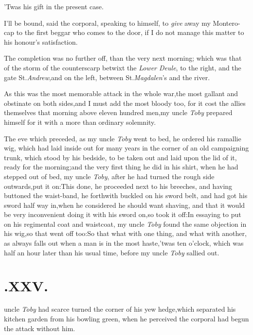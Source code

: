 \documentclass{article}
\begin{document}
\tsh ’Twas his gift in the present case.

I’ll be bound, said the corporal, speaking to himself, to
\textit{give} away my Montero-cap to the first beggar who comes to the door,
if I do not manage this matter to\break
his honour’s satisfaction.

The completion was no further off, than the very next morning; which was that of the
storm of the counterscarp betwixt the \textit{Lower Deule}, to the right, and the
gate St.\@ \textit{Andrew},\tsk and on the left, between St.\@ \textit{Magdalen}’s
and the river.

As this was the most memorable attack in the whole
war,\tsk the most gallant and obstinate on both sides,\tsk and
I must add the most bloody too, for it cost the allies themselves
that morning above eleven hundred men,\tsk my uncle \textit{Toby}
prepared himself for it with a more than ordinary solemnity.

The eve which preceded, as my uncle \textit{Toby} went to bed, he
ordered his ramallie wig, which had laid inside out for many years
in the corner of an old campaigning trunk, which stood by his
\setlength{\baselineskip}{13.3636pt}%
bedside, to be taken out and laid upon the lid of it, ready for the morning;\tsk and the
very first thing he did in his shirt, when he had stepped out of
bed, my uncle \textit{Toby}, after he had turned the rough side
outwards,\tsk put it on:\tsh\break This done, he proceeded
next to his breeches, and having buttoned the waist-band, he
forthwith buckled on his sword belt, and had got his sword half way
in,\break\tsk when he considered he should want shaving, and that it
would be very inconvenient doing it with his sword on,\tsk so
took it off:\tsh In essaying to put on his regimental coat
and waistcoat, my uncle \textit{Toby} found the same objection in his
wig,\tsk so that went off too:\tsk So that what with one thing,
and what with another, as always falls out when a man is in the
most haste,\tsk ’twas ten o’clock, which was half an
hour later than his usual time, before my uncle \textit{Toby} sallied
out.

\etp
\section{.\enspace XXV.}

 uncle \textit{Toby} had scarce
turned the corner of his yew hedge,\break which separated his
kitchen garden from his bowling green, when he perceived the
corporal had begun the attack without him.\tsh
\end{document}
